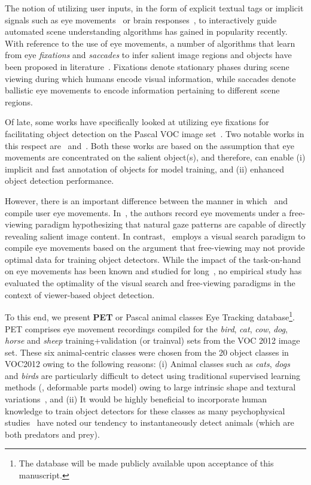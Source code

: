 \documentclass{article}
\begin{document}
The notion of utilizing user inputs, in the form  of explicit textual tags or implicit signals such as eye movements~\cite{RamanathanKSKC10,subramanian2014emotion} or brain responses~\cite{khomami2013user}, to interactively guide automated scene understanding algorithms has gained in popularity recently. With reference to the use of eye movements, a number of algorithms that learn from eye \textit{fixations} and \textit{saccades} to infer salient image regions and objects have been proposed in literature~\cite{Itti_Koch01nrn,subramanian2011can,borji2012boosting}. Fixations denote stationary phases during scene viewing during which humans encode visual information, while saccades denote ballistic eye movements to encode information pertaining to different scene regions. 

Of late, some works have specifically looked at utilizing eye fixations for facilitating object detection on the Pascal VOC image set~\cite{pascalvoc2012}. Two notable works in this respect are~\cite{kiwon_cvpr13_gaze} and~\cite{ PapadopoulosCKF14}. Both these works are based on the assumption that eye movements are concentrated on the salient object(s), and therefore, can enable (i) implicit and fast annotation of objects for model training, and (ii) enhanced  object detection performance. 

However, there is an important difference between the manner in which~\cite{kiwon_cvpr13_gaze} and~\cite{PapadopoulosCKF14} compile user eye movements. In~\cite{kiwon_cvpr13_gaze}, the authors record eye movements under a free-viewing paradigm hypothesizing that natural gaze patterns are capable of directly revealing salient image content. In contrast,~\cite{PapadopoulosCKF14} employs a visual search paradigm to compile eye movements based on the argument that free-viewing may not provide optimal data for training object detectors. While the impact of the task-on-hand on eye movements has been known and studied for long~\cite{Yarbus1967,deangelus2009top,tatler2010yarbus}, no empirical study has evaluated the optimality of the visual search and free-viewing paradigms in the context of viewer-based object detection. 

To this end, we present \textbf{PET} or Pascal animal classes Eye Tracking database\footnote{The database will be made publicly available upon acceptance of this manuscript.}. PET comprises eye movement recordings compiled for the \textit{bird}, \textit{cat}, \textit{cow}, \textit{dog}, \textit{horse} and \textit{sheep} training+validation (or trainval) sets from the VOC 2012 image set. These six animal-centric classes were chosen from the 20 object classes in VOC2012 owing to the following reasons: (i) Animal classes such as \textit{cats}, \textit{dogs} and \textit{birds} are particularly difficult to detect using traditional supervised learning methods (\eg, deformable parts model) owing to large intrinsic shape and textural variations~\cite{Parkhi11}, and (ii) It would be highly beneficial to incorporate human knowledge to train object detectors for these classes as many psychophysical studies~\cite{Judd_2009} have noted our tendency to instantaneously detect animals (which are both predators and prey).  
\end{document}
